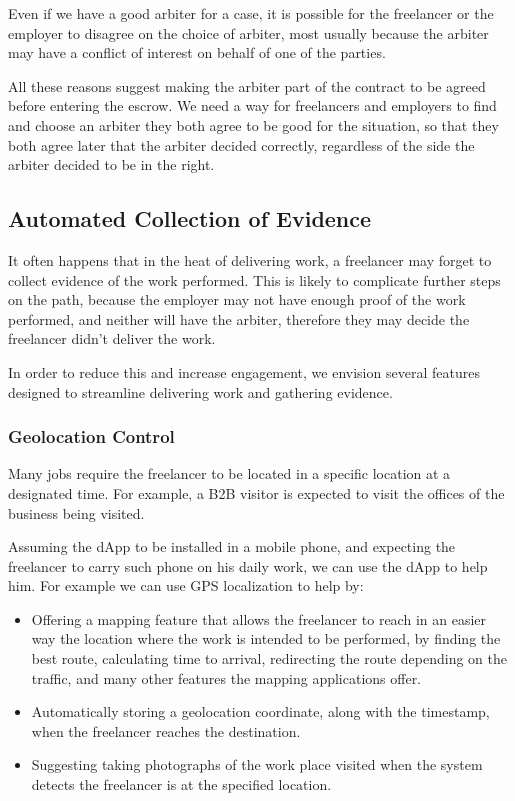 \documentclass{article}
\begin{document}
Even if we have a good arbiter for a case, it is possible for the freelancer or the employer to disagree on the choice of arbiter, most usually because the arbiter may have a conflict of interest on behalf of one of the parties.

All these reasons suggest making the arbiter part of the contract to be agreed before entering the escrow. We need a way for freelancers and employers to find and choose an arbiter they both agree to be good for the situation, so that they both agree later that the arbiter decided correctly, regardless of the side the arbiter decided to be in the right.

\subsection{Automated Collection of Evidence}

It often happens that in the heat of delivering work, a freelancer may forget to collect evidence of the work performed. This is likely to complicate further steps on the path, because the employer may not have enough proof of the work performed, and neither will have the arbiter, therefore they may decide the freelancer didn't deliver the work.

In order to reduce this and increase engagement, we envision several features designed to streamline delivering work and gathering evidence.

\subsubsection{Geolocation Control}

Many jobs require the freelancer to be located in a specific location at a designated time. For example, a B2B visitor is expected to visit the offices of the business being visited.

Assuming the dApp to be installed in a mobile phone, and expecting the freelancer to carry such phone on his daily work, we can use the dApp to help him. For example we can use GPS localization to help by:

\begin{itemize}
  \item Offering a mapping feature that allows the freelancer to reach in an easier way the location where the work is intended to be performed, by finding the best route, calculating time to arrival, redirecting the route depending on the traffic, and many other features the mapping applications offer.
  \item Automatically storing a geolocation coordinate, along with the timestamp, when the freelancer reaches the destination.
  \item Suggesting taking photographs of the work place visited when the system detects the freelancer is at the specified location.
\end{itemize}
\end{document}
